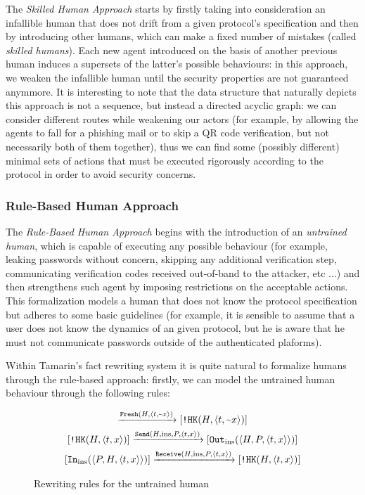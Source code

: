\documentclass{article}
\newcommand{\mono}[1]{\textrm{\tt #1}}
\begin{document}
The \textit{Skilled Human Approach} starts by firstly taking into consideration an infallible human that does not drift from a given protocol's specification and then by introducing other humans, which can make a fixed number of mistakes (called \textit{skilled humans}). Each new agent introduced on the basis of another previous human induces a supersets of the latter's possible behaviours: in this approach, we weaken the infallible human until the security properties are not guaranteed anymmore. It is interesting to note that the data structure that naturally depicts this approach is not a sequence, but instead a directed acyclic graph: we can consider different routes while weakening our actors (for example, by allowing the agents to fall for a phishing mail or to skip a QR code verification, but not necessarily both of them together), thus we can find some (possibly different) minimal sets of actions that must be executed rigorously according to the protocol in order to avoid security concerns.

\subsubsection{Rule-Based Human Approach}

The \textit{Rule-Based Human Approach} begins with the introduction of an \textit{untrained human}, which is capable of executing any possible behaviour (for example, leaking passwords without concern, skipping any additional verification step, communicating verification codes received out-of-band to the attacker, etc ...) and then strengthens such agent by imposing restrictions on the acceptable actions. This formalization models a human that does not know the protocol specification but adheres to some basic guidelines (for example, it is sensible to assume that a user does not know the dynamics of an given protocol, but he is aware that he must not communicate passwords outside of the authenticated plaforms).

Within Tamarin's fact rewriting system it is quite natural to formalize humans through the rule-based approach: firstly, we can model the untrained human behaviour through the following rules:

\begin{figure}[b]
\begin{gather}
    [\mono{Fr}(\textrm{\textasciitilde}x)] \xrightarrow{\mono{Fresh}(H, \langle t,\textrm{\textasciitilde}x \rangle)} [\mono{!HK}(H, \langle t,\textrm{\textasciitilde} x \rangle)] \label{eq:fresh_term_knowledge}\\
    [\mono{!HK}(H, \langle t, x \rangle)] \xrightarrow{\mono{Send}(H, \textrm{ins}, P, \langle t,x \rangle)} [\mono{Out}_{\textrm{ins}}(\langle H, P, \langle t,x \rangle \rangle)] \label{eq:telling_the_attacker}\\
    [\mono{In}_{\textrm{ins}}(\langle P, H, \langle t,x \rangle \rangle)] \xrightarrow{\mono{Receive}(H, \textrm{ins}, P, \langle t,x \rangle)} [\mono{!HK}(H, \langle t,x \rangle)] \label{eq:retrieving_from_the_attacker}
\end{gather}
\caption{Rewriting rules for the untrained human}
\end{figure}
\end{document}
